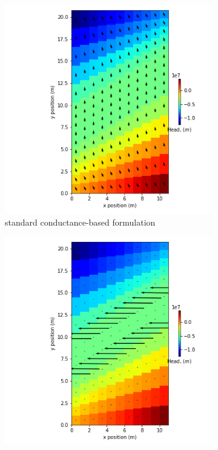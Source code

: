 \documentclass{article}
\begin{document}
\begin{figure}[H]
\centering
\begin{subfigure}{0.4\textwidth}
	\includegraphics[width=\textwidth]{../figures/disu-d-cf-vo-s-head.png}
	\caption{standard conductance-based formulation}
	\label{fig:disu-s-nocc-cf-head.}
\end{subfigure}
\hfill
\begin{subfigure}{0.4\textwidth}
	\includegraphics[width=\textwidth]{../figures/disu-d-cf-vo-x-head.png}

\end{subfigure}
\end{figure}
\end{document}
